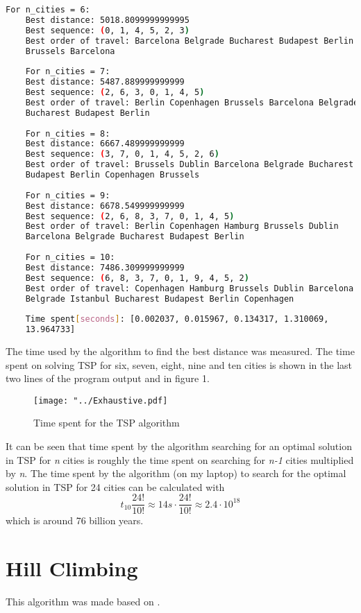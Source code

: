 \documentclass{article}
\begin{document}
\begin{lstlisting}[language=bash]
	For n_cities = 6:
	Best distance: 5018.8099999999995
	Best sequence: (0, 1, 4, 5, 2, 3)
	Best order of travel: Barcelona Belgrade Bucharest Budapest Berlin 
	Brussels Barcelona
 
	For n_cities = 7:
	Best distance: 5487.889999999999
	Best sequence: (2, 6, 3, 0, 1, 4, 5)
	Best order of travel: Berlin Copenhagen Brussels Barcelona Belgrade 
	Bucharest Budapest Berlin
 
	For n_cities = 8:
	Best distance: 6667.489999999999
	Best sequence: (3, 7, 0, 1, 4, 5, 2, 6)
	Best order of travel: Brussels Dublin Barcelona Belgrade Bucharest 
	Budapest Berlin Copenhagen Brussels
 
	For n_cities = 9:
	Best distance: 6678.549999999999
	Best sequence: (2, 6, 8, 3, 7, 0, 1, 4, 5)
	Best order of travel: Berlin Copenhagen Hamburg Brussels Dublin 
	Barcelona Belgrade Bucharest Budapest Berlin
 
	For n_cities = 10:
	Best distance: 7486.309999999999
	Best sequence: (6, 8, 3, 7, 0, 1, 9, 4, 5, 2)
	Best order of travel: Copenhagen Hamburg Brussels Dublin Barcelona 
	Belgrade Istanbul Bucharest Budapest Berlin Copenhagen
	 
	Time spent[seconds]: [0.002037, 0.015967, 0.134317, 1.310069, 
	13.964733]
\end{lstlisting}
The time used by the algorithm to find the best distance was measured. The time spent on solving TSP for six, seven, eight, nine and ten cities is shown in the last two lines of the program output and in figure 1.

\begin{figure}[H]
\begin{center}
\texttt{[image: "../Exhaustive.pdf]}
\caption{Time spent for the TSP algorithm}
\end{center}
\end{figure}
\noindent
It can be seen that time spent by the algorithm searching for an optimal solution in TSP for  \textit{n} cities is roughly the time spent on searching for \textit{n-1} cities multiplied by \textit{n}. The time spent by the algorithm (on my laptop) to search for the optimal solution in TSP for 24 cities can be calculated with
\[
	t_{10} \frac{24!}{10!} \approx 14s \cdot \frac{24!}{10!} \approx 2.4 \cdot 10^{18}
\]
which is around 76 billion years.

\section{Hill Climbing}
This algorithm was made based on \cite[chapter 9.4.3]{marsland}. 
 
\end{document}
